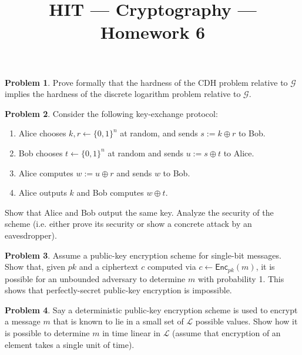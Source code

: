 \documentclass[11pt]{article}
\title{HIT --- Cryptography --- Homework 6}
\theoremstyle{definition}
\newtheorem{problem}{Problem}
\begin{document}
\maketitle

\begin{problem}
Prove formally that the hardness of the CDH problem relative to $\mathcal{G}$ implies the hardness of the discrete logarithm problem relative to $\mathcal{G}$.
\end{problem}

\begin{problem}
Consider the following key-exchange protocol:
\begin{enumerate}
\item Alice chooses $k,r \gets \{0,1\}^n$ at random, and sends $s:=k\oplus r$ to Bob.
\item Bob chooses $t \gets \{0,1\}^n$ at random and sends $u := s\oplus t$ to Alice.
\item Alice computes $w := u\oplus r$ and sends $w$ to Bob.
\item Alice outputs $k$ and Bob computes $w \oplus t$.
\end{enumerate}
Show that Alice and Bob output the same key. Analyze the security of the scheme (i.e. either prove its security or show a concrete attack by an eavesdropper).
\end{problem}


\begin{problem}
Assume a public-key encryption scheme for single-bit messages. Show that, given $pk$ and a ciphertext $c$ computed via $c \gets \mathsf{Enc}_{pk}(m)$, it is possible for an unbounded adversary to determine $m$ with probability 1. This shows that perfectly-secret public-key encryption is impossible.
\end{problem}

\begin{problem}
Say a deterministic public-key encryption scheme is used to encrypt a message $m$ that is known to lie in a small set of $\mathcal{L}$ possible values. Show how it is possible to determine $m$ in time linear in $\mathcal{L}$ (assume that encryption of an element takes a single unit of time).
\end{problem}

\end{document}
